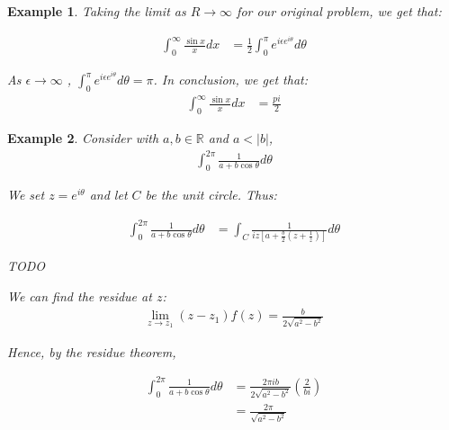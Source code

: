 \documentclass{article}
\newtheorem{ex}{Example}
\theoremstyle{definition}
\def\R{\mathbb{R}}
\begin{document}
\begin{ex}
Taking the limit as $R \to \infty$ for our original problem, we get that:

\begin{align*}
\int_0^\infty \frac{\sin x}{x} dx  &= \frac{1}{2} \int_{0}^{\pi} e^{i \epsilon e^{i \theta }} d\theta 
\end{align*}

As $\epsilon \to \infty$ , $\int_{0}^{\pi} e^{i \epsilon e^{i \theta }} d\theta = \pi$. In conclusion, we get that:
\begin{align*}
\int_0^\infty \frac{\sin x}{x} dx  &= \frac{pi}{2}
\end{align*}
\end{ex}

\begin{ex}
Consider with $a,b \in \R $ and $a<|b|$, 
\begin{align*}
\int_0^{2\pi} \frac{1}{a+b \cos \theta} d\theta
\end{align*}

We set $z=e^{i\theta}$ and let $C$ be the unit circle. Thus:

\begin{align*}
\int_0^{2\pi} \frac{1}{a+b \cos \theta} d\theta &= \int_C \frac{1}{iz[a+\frac{b}{2} (z+\frac{1}{z})]} d\theta
\end{align*}


TODO

We can find the residue at $z$: 
\begin{align*}
\lim_{z \to z_1} (z-z_1) f(z) = \frac{b}{2\sqrt{a^2-b^2}}
\end{align*}

Hence, by the residue theorem, 

\begin{align*}
\int_0^{2\pi} \frac{1}{a+b \cos \theta} d\theta &= \frac{2\pi i b}{2\sqrt{a^2-b^2}} \left(\frac{2}{bi}\right) \\ 
&= \frac{2\pi }{\sqrt{a^2-b^2}} 
\end{align*}


\end{ex}
\end{document}
